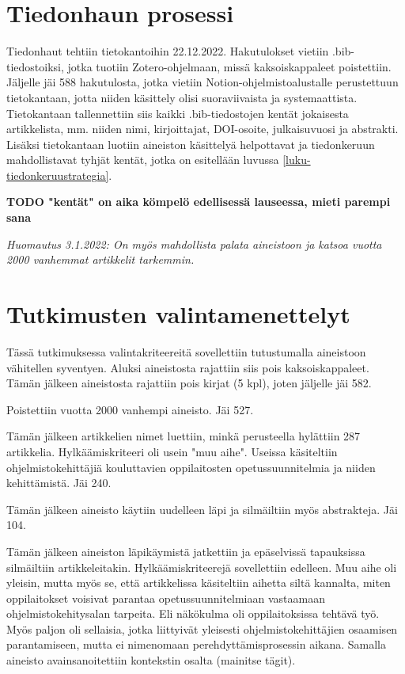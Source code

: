 \documentclass[utf8]{gradu3}
\begin{document}
\section{Tiedonhaun prosessi}

Tiedonhaut tehtiin tietokantoihin 22.12.2022. Hakutulokset vietiin .bib-tiedostoiksi, jotka tuotiin Zotero-ohjelmaan, missä kaksoiskappaleet poistettiin. Jäljelle jäi 588 hakutulosta, jotka vietiin Notion-ohjelmistoalustalle perustettuun tietokantaan, jotta niiden käsittely olisi suoraviivaista ja systemaattista. Tietokantaan tallennettiin siis kaikki .bib-tiedostojen kentät jokaisesta artikkelista, mm. niiden nimi, kirjoittajat, DOI-osoite, julkaisuvuosi ja abstrakti. Lisäksi tietokantaan luotiin aineiston käsittelyä helpottavat ja tiedonkeruun mahdollistavat tyhjät kentät, jotka on esitellään luvussa \ref{luku-tiedonkeruustrategia}.

\textbf{TODO "kentät" on aika kömpelö edellisessä lauseessa, mieti parempi sana}

\textit{Huomautus 3.1.2022: On myös mahdollista palata aineistoon ja katsoa vuotta 2000 vanhemmat artikkelit tarkemmin.}

\section{Tutkimusten valintamenettelyt}

Tässä tutkimuksessa valintakriteereitä sovellettiin tutustumalla aineistoon vähitellen syventyen. Aluksi aineistosta rajattiin siis pois kaksoiskappaleet. Tämän jälkeen aineistosta rajattiin pois kirjat (5 kpl), joten jäljelle jäi 582. 

Poistettiin vuotta 2000 vanhempi aineisto. Jäi 527.

Tämän jälkeen artikkelien nimet luettiin, minkä perusteella hylättiin 287 artikkelia. Hylkäämiskriteeri oli usein "muu aihe". Useissa käsiteltiin ohjelmistokehittäjiä kouluttavien oppilaitosten opetussuunnitelmia ja niiden kehittämistä. Jäi 240.

Tämän jälkeen aineisto käytiin uudelleen läpi ja silmäiltiin myös abstrakteja. Jäi 104. 

Tämän jälkeen aineiston läpikäymistä jatkettiin ja epäselvissä tapauksissa silmäiltiin artikkeleitakin. Hylkäämiskriteerejä sovellettiin edelleen. Muu aihe oli yleisin, mutta myös se, että artikkelissa käsiteltiin aihetta siltä kannalta, miten oppilaitokset voisivat parantaa opetussuunnitelmiaan vastaamaan ohjelmistokehitysalan tarpeita. Eli näkökulma oli oppilaitoksissa tehtävä työ. Myös paljon oli sellaisia, jotka liittyivät yleisesti ohjelmistokehittäjien osaamisen parantamiseen, mutta ei nimenomaan perehdyttämisprosessin aikana. Samalla aineisto avainsanoitettiin kontekstin osalta (mainitse tägit).
\end{document}
